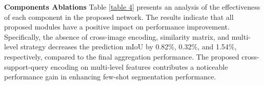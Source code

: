 \documentclass[conference]{IEEEtran}
\begin{document}
 

\textbf{Components Ablations} Table \ref{table 4} presents an analysis of the effectiveness of each component in the proposed network. The results indicate that all proposed modules have a positive impact on performance improvement. Specifically, the absence of cross-image encoding, similarity matrix, and multi-level strategy decreases the prediction mIoU by 0.82\%, 0.32\%, and 1.54\%, respectively, compared to the final aggregation performance. The proposed cross-support-query encoding on multi-level features contributes a noticeable performance gain in enhancing few-shot segmentation performance.

 

\begin{table}[]

\vspace{-2.0em}

\caption{The performance of optimal output map of the masked cross-image encoding module}
\label{table 3}

\centering
{}
\end{table}

 

\begin{table}[]

\vspace{-1.0em}


\centering

\caption{The results of module performance}
\label{table 4}
\vspace{-1.0em}
\end{table}
\end{document}

